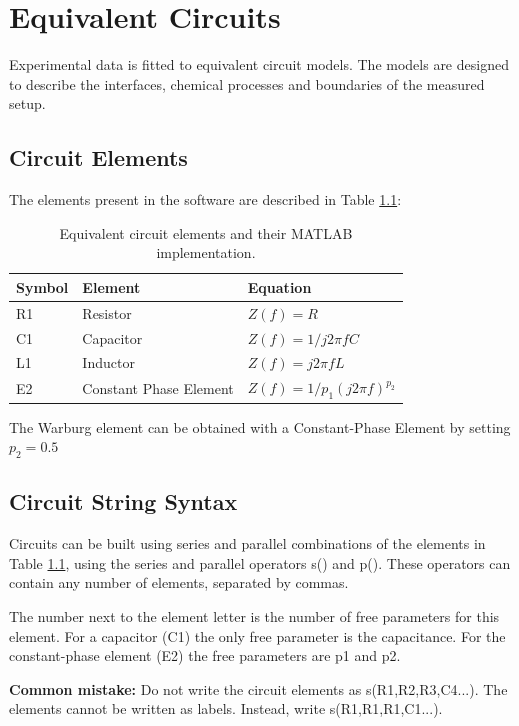 \documentclass[10pt,b5paper,oneside]{book}
\begin{document}
\chapter{Equivalent Circuits}

Experimental data is fitted to equivalent circuit models. The models are designed to describe the interfaces, chemical processes and boundaries of the measured setup.

\section{Circuit Elements}

The elements present in the software are described in Table \ref{circelements}:

\begin{table}[h]
	\centering
	\caption{Equivalent circuit elements and their MATLAB implementation.}
	\label{circelements}
	\begin{tabular}{lll}
		\hline \textbf{Symbol} & \textbf{Element} & \textbf{Equation}\\
		\hline R1 & Resistor & $Z(f) = R$ \\ 
		C1 & Capacitor & $Z(f) = 1 / j 2\pi fC$ \\ 
		L1 & Inductor & $Z(f) = j 2\pi fL$ \\
		E2 & Constant Phase Element & $Z(f) = 1 / p_1 (j 2 \pi f)^{p_2} $ \\
		\hline
	\end{tabular}
\end{table}

The Warburg element can be obtained with a Constant-Phase Element by setting $p_2=0.5$


\section{Circuit String Syntax}

Circuits can be built using series and parallel combinations of the elements in Table \ref{circelements}, using the series and parallel operators s() and p(). These operators can contain any number of elements, separated by commas.

The number next to the element letter is the number of free parameters for this element. For a capacitor (C1) the only free parameter is the capacitance. For the constant-phase element (E2) the free parameters are p1 and p2.

\textbf{Common mistake:} Do not write the circuit elements as s(R1,R2,R3,C4...). The elements cannot be written as labels. Instead, write s(R1,R1,R1,C1...).
\end{document}
